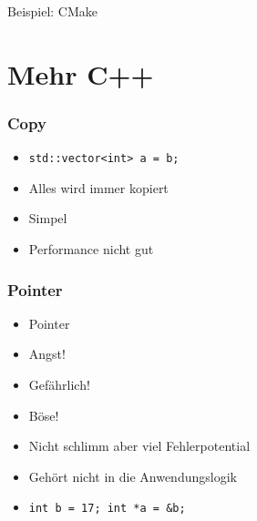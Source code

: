 \documentclass[aspectratio=169]{beamer}
\begin{document}
\begin{frame}
    \Huge{Beispiel: CMake}
\end{frame}


\section{Mehr C++}

\begin{frame}
    \frametitle{Copy}
    \begin{itemize}
        \item \lstinline{std::vector<int> a = b;}
            \pause
        \item Alles wird immer kopiert 
            \pause
        \item Simpel 
            \pause
        \item Performance nicht gut
    \end{itemize}
\end{frame}

\begin{frame}
    \frametitle{Pointer}
    \begin{itemize}
        \item Pointer 
            \pause
        \item Angst!
            \pause
        \item Gefährlich!
            \pause
        \item Böse!
            \pause
        \item Nicht schlimm aber viel Fehlerpotential
            \pause
        \item Gehört nicht in die Anwendungslogik
            \pause
        \item
            \lstinline{int b = 17; int *a = &b;}
    \end{itemize}
\end{frame}
\end{document}
